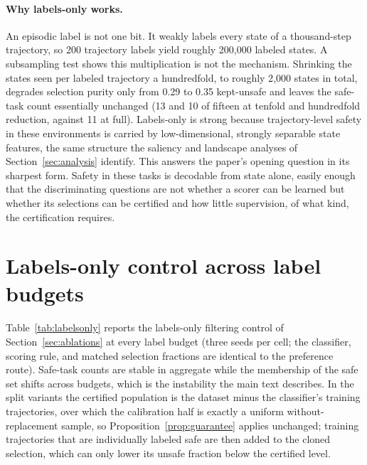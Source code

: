 \documentclass{article} %
\begin{document}
\paragraph{Why labels-only works.} An episodic label is not one bit. It weakly labels every state of a thousand-step trajectory, so 200 trajectory labels yield roughly 200{,}000 labeled states. A subsampling test shows this multiplication is not the mechanism. Shrinking the states seen per labeled trajectory a hundredfold, to roughly 2{,}000 states in total, degrades selection purity only from 0.29 to 0.35 kept-unsafe and leaves the safe-task count essentially unchanged (13 and 10 of fifteen at tenfold and hundredfold reduction, against 11 at full). Labels-only is strong because trajectory-level safety in these environments is carried by low-dimensional, strongly separable state features, the same structure the saliency and landscape analyses of Section~\ref{sec:analysis} identify. This answers the paper's opening question in its sharpest form. Safety in these tasks is decodable from state alone, easily enough that the discriminating questions are not whether a scorer can be learned but whether its selections can be certified and how little supervision, of what kind, the certification requires.

\section{Labels-only control across label budgets}
\label{app:labelsonly}
Table~\ref{tab:labelsonly} reports the labels-only filtering control of Section~\ref{sec:ablations} at every label budget (three seeds per cell; the classifier, scoring rule, and matched selection fractions are identical to the preference route). Safe-task counts are stable in aggregate while the membership of the safe set shifts across budgets, which is the instability the main text describes. In the split variants the certified population is the dataset minus the classifier's training trajectories, over which the calibration half is exactly a uniform without-replacement sample, so Proposition~\ref{prop:guarantee} applies unchanged; training trajectories that are individually labeled safe are then added to the cloned selection, which can only lower its unsafe fraction below the certified level.
\end{document}
